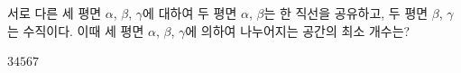 서로 다른 세 평면 $\alpha$, $\beta$, $\gamma$에 대하여 두 평면 $\alpha$, $\beta$는 한 직선을 공유하고, 두 평면 $\beta$, $\gamma$는 수직이다. 이때 세 평면 $\alpha$, $\beta$, $\gamma$에 의하여 나누어지는 공간의 최소 개수는?
\begin{choices32}{$3$}{$4$}{$5$}{$6$}{$7$}\end{choices32}

